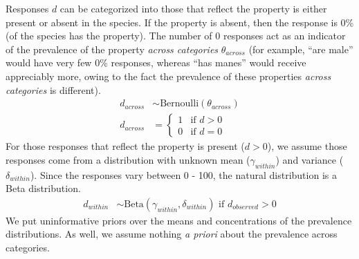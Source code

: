 \documentclass[10pt,letterpaper]{article}
\begin{document}
Responses $d$ can be categorized into those that reflect the property is either present or absent in the species. 
If the property is absent, then the response is 0\% (of the species has the property). 
The number of 0 responses act as an indicator of the prevalence of the property \emph{across categories} $\theta_{across}$ (for example, ``are male'' would have very few 0\% responses, whereas ``has manes'' would receive appreciably more, owing to the fact the prevalence of these properties \emph{across categories} is different).
%
\begin{align*}
d_{across} & \sim \text{Bernoulli}(\theta_{across}) \\
d_{across} & = \begin{cases}
				1 & \mbox{if } d > 0 \\
				0 & \mbox{if } d = 0 
				\end{cases}
\end{align*}
%
For those responses that reflect the property is present ($d > 0$), we assume those responses come from a distribution with unknown mean ($\gamma_{within}$) and variance ($\delta_{within}$). 
Since the responses vary between 0 - 100, the natural distribution is a Beta distribution. 
%
\begin{align*}
d_{within} & \sim \text{Beta}(\gamma_{within}, \delta_{within})  \mbox{ if } d_{observed} > 0
\end{align*}
%
%
We put uninformative priors over the means and concentrations of the prevalence distributions.  As well, we assume nothing \emph{a priori} about the prevalence across categories. 
\end{document}
